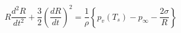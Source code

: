 \documentclass{article}
\begin{document}
\[
R \frac{d^2 R}{d t^2} + \frac{3}{2} \left( \frac{d R}{d t} \right)^2 = \frac{1}{\rho} \left\{ p_{v}\left(T_{s}\right) - p_{\infty} - \frac{2 \sigma}{R} \right\}
\]
\end{document}
